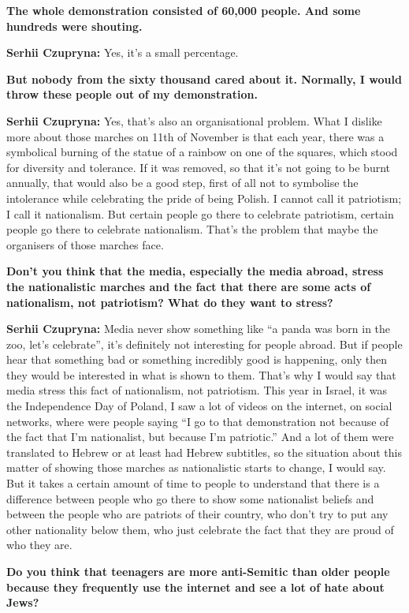 \textbf{The whole demonstration consisted of 60,000 people. And some hundreds were shouting.}\par 
\textbf{Serhii Czupryna:} Yes, it’s a small percentage. \par
\textbf{But nobody from the sixty thousand cared about it. Normally, I would throw these people out of my demonstration.} \par 
\textbf{Serhii Czupryna:} Yes, that’s also an organisational problem. What I dislike more about those marches on 11th of November is that each year, there was a symbolical burning of the statue of a rainbow on one of the squares, which stood for diversity and tolerance. If it was removed, so that it’s not going to be burnt annually, that would also be a good step, first of all not to symbolise the intolerance while celebrating the pride of being Polish. I cannot call it patriotism; I call it nationalism. But certain people go there to celebrate patriotism, certain people go there to celebrate nationalism. That’s the problem that maybe the organisers of those marches face.\par
\textbf{Don’t you think that the media, especially the media abroad, stress the nationalistic marches and the fact that there are some acts of nationalism, not patriotism? What do they want to stress?}\par 
\textbf{Serhii Czupryna:} Media never show something like ``a panda was born in the zoo, let’s celebrate'', it’s definitely not interesting for people abroad. But if people hear that something bad or something incredibly good is happening, only then they would be interested in what is shown to them. That’s why I would say that media stress this fact of nationalism, not patriotism. This year in Israel, it was the Independence Day of Poland, I saw a lot of videos on the internet, on social networks, where were people saying ``I go to that demonstration not because of the fact that I’m nationalist, but because I’m patriotic.'' And a lot of them were translated to Hebrew or at least had Hebrew subtitles, so the situation about this matter of showing those marches as nationalistic starts to change, I would say. But it takes a certain amount of time to people to understand that there is a difference between people who go there to show some nationalist beliefs and between the people who are patriots of their country, who don’t try to put any other nationality below them, who just celebrate the fact that they are proud of who they are.\par
\textbf{Do you think that teenagers are more anti-Semitic than older people because they frequently use the internet and see a lot of hate about Jews? }\par
